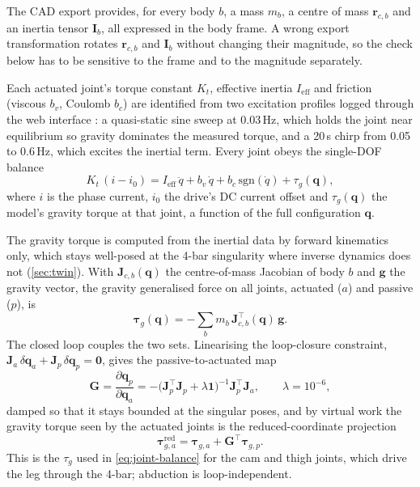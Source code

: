 The CAD export provides, for every body $b$, a mass $m_b$, a centre of mass $\mathbf r_{c,b}$ and an
inertia tensor $\mathbf I_b$, all expressed in the body frame. A wrong export transformation rotates
$\mathbf r_{c,b}$ and $\mathbf I_b$ without changing their magnitude, so the check below has to be
sensitive to the frame and to the magnitude separately.

Each actuated joint's torque constant $K_t$, effective inertia $I_{\mathrm{eff}}$ and friction
(viscous $b_v$, Coulomb $b_c$) are identified from two excitation profiles logged through the web
interface \cite{morand2026runningrobot}: a quasi-static sine sweep at 0.03\,Hz, which holds the
joint near equilibrium so gravity dominates the measured torque, and a 20\,s chirp from 0.05 to
0.6\,Hz, which excites the inertial term. Every joint obeys the single-DOF balance
\begin{equation}
K_t\,(i - i_0) = I_{\mathrm{eff}}\,\ddot q + b_v\,\dot q + b_c\,\mathrm{sgn}(\dot q) + \tau_g(\mathbf q),
\label{eq:joint-balance}
\end{equation}
where $i$ is the phase current, $i_0$ the drive's DC current offset and $\tau_g(\mathbf q)$ the
model's gravity torque at that joint, a function of the full configuration $\mathbf q$.

The gravity torque is computed from the inertial data by forward kinematics only, which stays
well-posed at the 4-bar singularity where inverse dynamics does not (\cref{sec:twin}). With
$\mathbf J_{c,b}(\mathbf q)$ the centre-of-mass Jacobian of body $b$ and $\mathbf g$ the gravity
vector, the gravity generalised force on all joints, actuated ($a$) and passive ($p$), is
\begin{equation}
\boldsymbol\tau_g(\mathbf q) = -\sum_b m_b\,\mathbf J_{c,b}^{\!\top}(\mathbf q)\,\mathbf g .
\label{eq:grav-torque}
\end{equation}
The closed loop couples the two sets. Linearising the loop-closure constraint,
$\mathbf J_a\,\delta\mathbf q_a + \mathbf J_p\,\delta\mathbf q_p = \mathbf 0$, gives the
passive-to-actuated map
\begin{equation}
\mathbf G = \frac{\partial \mathbf q_p}{\partial \mathbf q_a}
          = -\bigl(\mathbf J_p^{\!\top}\mathbf J_p + \lambda\mathbf 1\bigr)^{-1}\mathbf J_p^{\!\top}\mathbf J_a,
\qquad \lambda = 10^{-6},
\label{eq:loop-jacobian}
\end{equation}
damped so that it stays bounded at the singular poses, and by virtual work the gravity torque seen
by the actuated joints is the reduced-coordinate projection
\begin{equation}
\boldsymbol\tau_{g,a}^{\mathrm{red}} = \boldsymbol\tau_{g,a} + \mathbf G^{\!\top}\boldsymbol\tau_{g,p}.
\label{eq:grav-reduced}
\end{equation}
This is the $\tau_g$ used in \cref{eq:joint-balance} for the cam and thigh joints, which drive the
leg through the 4-bar; abduction is loop-independent.

